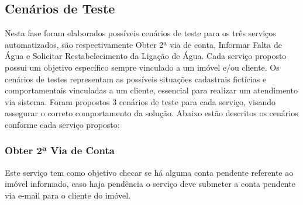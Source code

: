 \subsection{Cenários de Teste}
Nesta fase foram elaborados possíveis cenários de teste para os três serviços automatizados, são respectivamente Obter 2ª via de conta, Informar Falta de Água e Solicitar Restabelecimento da Ligação de Água. Cada serviço proposto possui um objetivo específico sempre vinculado a um imóvel e/ou cliente.
Os cenários de testes representam as possíveis situações cadastrais fictícias e comportamentais vinculadas a um cliente, essencial para realizar um atendimento via sistema. Foram propostos 3 cenários de teste para cada serviço, visando assegurar o correto comportamento da solução. Abaixo estão descritos os cenários conforme cada serviço proposto:

\subsubsection{Obter 2ª Via de Conta}
Este serviço tem como objetivo checar se há alguma conta pendente referente ao imóvel informado, caso haja pendência o serviço deve submeter a conta pendente via e-mail para o cliente do imóvel. 

